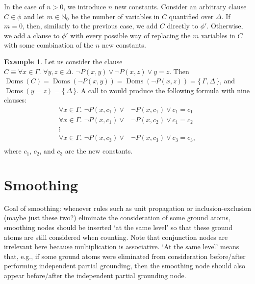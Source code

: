 \documentclass{article}
\theoremstyle{definition}
\newtheorem{example}{Example}
\DeclareMathOperator{\Doms}{Doms}
\begin{document}
In the case of $n>0$, we introduce $n$ new constants. Consider an arbitrary
clause $C \in \phi$ and let $m \in \mathbb{N}_{0}$ be the number of variables in
$C$ quantified over $\Delta$. If $m=0$, then, similarly to the previous case, we
add $C$ directly to $\phi'$. Otherwise, we add a clause to $\phi'$ with every
possible way of replacing the $m$ variables in $C$ with some combination of the
$n$ new constants.

\begin{example}
  Let us consider the clause $C \equiv \forall x \in \Gamma\text{.
  }\forall y, z \in \Delta\text{. } \neg P(x, y) \lor \neg P(x, z) \lor y=z$.
  Then
  $\Doms(C) = \Doms(\neg P(x, y)) = \Doms(\neg P(x, z)) = \{\, \Gamma, \Delta \,\}$,
  and $\Doms(y=z) = \{\, \Delta \,\}$. A call to  would produce the following formula with nine clauses:
  \begin{align*}
    \forall x \in \Gamma\text{. }\neg P(x, c_{1}) \lor& \neg P(x, c_{1}) \lor c_{1}=c_{1}\\
    \forall x \in \Gamma\text{. }\neg P(x, c_{1}) \lor& \neg P(x, c_{2}) \lor c_{1}=c_{2}\\
    \vdots&\\
    \forall x \in \Gamma\text{. }\neg P(x, c_{3}) \lor& \neg P(x, c_{3}) \lor c_{3}=c_{3},\\
  \end{align*}
  where $c_{1}$, $c_{2}$, and $c_{3}$ are the new constants.
\end{example}

\section{Smoothing}

Goal of smoothing: whenever rules such as unit propagation or
inclusion-exclusion (maybe just these two?) eliminate the consideration of some
ground atoms, smoothing nodes should be inserted `at the same level' so that
these ground atoms are still considered when counting. Note that conjunction
nodes are irrelevant here because multiplication is associative. `At the same
level' means that, e.g., if some ground atoms were eliminated from consideration
before/after performing independent partial grounding, then the smoothing node
should also appear before/after the independent partial grounding node.

\end{document}
